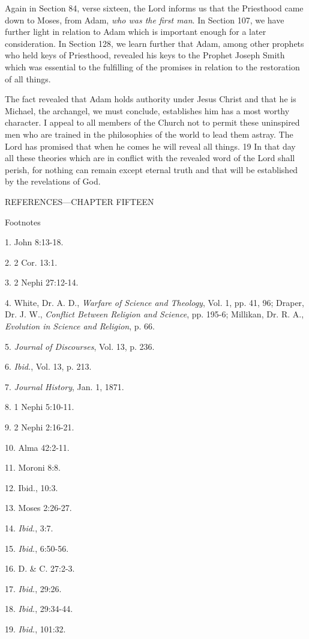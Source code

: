 Again in Section 84, verse sixteen, the Lord informs us that the Priesthood came down to
Moses, from Adam, \textit{who was the first man}. In Section 107, we have further light in relation
to Adam which is important enough for a later consideration. In Section 128, we learn further
that Adam, among other prophets who held keys of Priesthood, revealed his keys to the
Prophet Joseph Smith which was essential to the fulfilling of the promises in relation to the
restoration of all things.

The fact revealed that Adam holds authority under Jesus Christ and that he is Michael, the
archangel, we must conclude, establishes him has a most worthy character. I appeal to all
members of the Church not to permit these uninspired men who are trained in the
philosophies of the world to lead them astray. The Lord has promised that when he comes he
will reveal all things. 19 In that day all these theories which are in conflict with the revealed
word of the Lord shall perish, for nothing can remain except eternal truth and that will be
established by the revelations of God.

\newpage
REFERENCES—CHAPTER FIFTEEN

Footnotes

1. John 8:13-18.

2. 2 Cor. 13:1.

3. 2 Nephi 27:12-14.

4. White, Dr. A. D., \textit{Warfare of Science and Theology}, Vol. 1, pp. 41, 96; Draper, Dr. J. W.,
\textit{Conflict Between Religion and Science}, pp. 195-6; Millikan, Dr. R. A., \textit{Evolution in Science
and Religion}, p. 66.

5. \textit{Journal of Discourses}, Vol. 13, p. 236.

6. \textit{Ibid.}, Vol. 13, p. 213.

7. \textit{Journal History}, Jan. 1, 1871.

8. 1 Nephi 5:10-11.

9. 2 Nephi 2:16-21.

10. Alma 42:2-11.

11. Moroni 8:8.

12. Ibid., 10:3.

13. Moses 2:26-27.

14. \textit{Ibid.}, 3:7.

15. \textit{Ibid.}, 6:50-56.

16. D. \& C. 27:2-3.

17. \textit{Ibid.}, 29:26.

18. \textit{Ibid.}, 29:34-44.

19. \textit{Ibid.}, 101:32.

